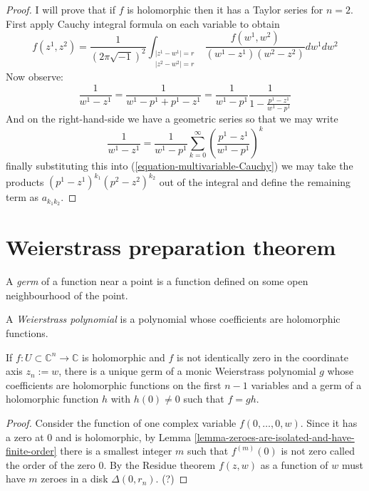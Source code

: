 \begin{proof}
I will prove that if $f$ is holomorphic then it has a Taylor series for $n=2$. 
First apply Cauchy integral formula on each variable to obtain
$$
f(z^1,z^2)=\frac{1}{(2\pi\sqrt{-1})^2}
\int_{\substack{|z^1-w^1|=r \\ |z^2-w^2|=r}}
\frac{f(w^1,w^2)}{(w^1-z^1)(w^2-z^2)}dw^1dw^2
$$
Now observe:
\begin{equation}
\label{equation-multivariable-Cauchy}
\frac{1}{w^1-z^1}=\frac{1}{w^1-p^1+p^1-z^1}
=\frac{1}{w^1-p^1}\frac{1}{1-\frac{p^1-z^1}{w^1-p^1}}
\end{equation}
And on the right-hand-side we have a geometric series so that we may write
$$
\frac{1}{w^1-z^1}
=\frac{1}{w^1-p^1}\sum_{k=0}^\infty\left(\frac{p^1-z^1}{w^1-p^1}\right)^k
$$
finally substituting this into (\ref{equation-multivariable-Cauchy}) we may take
the products $(p^1-z^1)^{k_1}(p^2-z^2)^{k_2}$ out of the integral and define the
remaining term as $a_{k_1k_2}$.
\end{proof}

\section{Weierstrass preparation theorem}
\label{section-Weierstrass-preparation-theorem}

\begin{definition}
\label{definition-germ}
A {\it germ} of a function near a point is a function defined on some open 
neighbourhood of the point.
\end{definition}

\begin{definition}
\label{definition-Weierstrass-polynomial}
A {\it Weierstrass polynomial} is a polynomial whose coefficients are
holomorphic functions.
\end{definition}

\begin{theorem}
\label{theorem-Weierstrass-preparation}
If $f:U\subset\mathbb{C}^n\to\mathbb{C}$ is holomorphic and $f$ is not
identically zero in the coordinate axis $z_n:=w$, there
is a unique germ of a monic Weierstrass polynomial $g$ whose coefficients are
holomorphic functions on the first $n-1$ variables 
and a germ of a holomorphic 
function $h$ with $h(0)\neq 0$ such that $f=gh$.
\end{theorem}

\begin{proof}
Consider the function of one complex variable $f(0,\ldots,0,w)$. Since it has a
zero at $0$ and is holomorphic, by Lemma 
\ref{lemma-zeroes-are-isolated-and-have-finite-order} there is a smallest 
integer $m$ such that $f^{(m)}(0)$ is not zero called the order of the zero $0$.
By the Residue theorem $f(z,w)$ as a function of $w$ must have $m$ zeroes in a
disk $\Delta(0,r_n)$. (?)
\end{proof}

